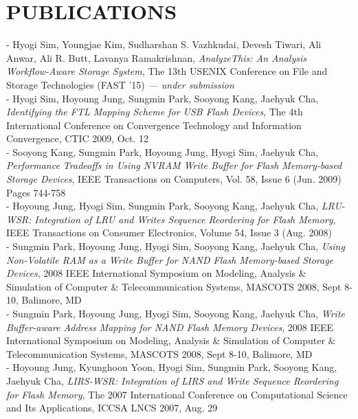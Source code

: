 \section{PUBLICATIONS} 
\vspace{0.07in}
  - Hyogi Sim, Youngjae Kim, Sudharshan S. Vazhkudai, Devesh Tiwari, Ali Anwar,
  Ali R. Butt, Lavanya Ramakrishnan,
  {\it AnalyzeThis: An Analysis Workflow-Aware Storage System},
  The 13th USENIX Conference on File and Storage Technologies (FAST '15)
  {\it \small --- under submission}
\vspace{0.03in}\\
  - Hyogi Sim, Hoyoung Jung, Sungmin Park, Sooyong Kang, Jaehyuk Cha,
  {\it Identifying the FTL Mapping Scheme for USB Flash Devices},
  The 4th International Conference on Convergence Technology
  and Information Convergence, CTIC 2009, Oct. 12
\vspace{0.03in}\\
  - Sooyong Kang, Sungmin Park, Hoyoung Jung, Hyogi Sim, Jaehyuk Cha,
  {\it Performance Tradeoffs in Using NVRAM Write Buffer for Flash Memory-based
  Storage Devices},
  IEEE Transactions on Computers, Vol. 58, Issue 6 (Jun. 2009) Pages 744-758
\vspace{0.03in}\\
 - Hoyoung Jung, Hyogi Sim, Sungmin Park, Sooyong Kang, Jaehyuk Cha,
 {\it LRU-WSR: Integration of LRU and Writes Sequence Reordering for Flash
 Memory},
 IEEE Transactions on Consumer Electronics, Volume 54, Issue 3 (Aug. 2008)
\vspace{0.03in}\\
 - Sungmin Park, Hoyoung Jung, Hyogi Sim, Sooyong Kang, Jaehyuk Cha,
 {\it Using Non-Volatile RAM as a Write Buffer for NAND Flash Memory-based
 Storage Devices},
 2008 IEEE International Symposium on Modeling, Analysis \& Simulation of
 Computer \& Telecommunication Systems, MASCOTS 2008, Sept 8-10, Balimore, MD
\vspace{0.03in}\\
 - Sungmin Park, Hoyoung Jung, Hyogi Sim, Sooyong Kang, Jaehyuk Cha,
 {\it Write Buffer-aware Address Mapping for NAND Flash Memory Devices},
 2008 IEEE International Symposium on Modeling, Analysis \& Simulation of
 Computer \& Telecommunication Systems, MASCOTS 2008, Sept 8-10, Balimore, MD
\vspace{0.03in}\\
 - Hoyoung Jung, Kyunghoon Yoon, Hyogi Sim, Sungmin Park, Sooyong Kang,
 Jaehyuk Cha,
 {\it LIRS-WSR: Integration of LIRS and Write Sequence Reordering for Flash
 Memory},
 The 2007 International Conference on Computational Science and Its
 Applications, ICCSA LNCS 2007, Aug. 29

